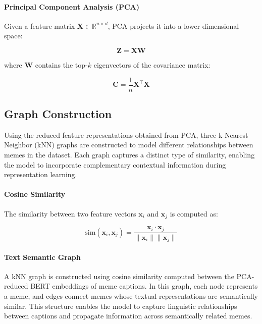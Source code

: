 \documentclass[a4paper]{cas-sc}
\begin{document}
\paragraph{Principal Component Analysis (PCA)}

Given a feature matrix $\mathbf{X} \in \mathbb{R}^{n \times d}$, PCA projects it into a lower-dimensional space:

\begin{equation}
\mathbf{Z} = \mathbf{X}\mathbf{W}
\end{equation}

where $\mathbf{W}$ contains the top-$k$ eigenvectors of the covariance matrix:

\begin{equation}
\mathbf{C} = \frac{1}{n} \mathbf{X}^\top \mathbf{X}
\end{equation}

\subsection{Graph Construction}

Using the reduced feature representations obtained from PCA, three k-Nearest Neighbor (kNN) graphs are constructed to model different relationships between memes in the dataset. Each graph captures a distinct type of similarity, enabling the model to incorporate complementary contextual information during representation learning.

\paragraph{Cosine Similarity}

The similarity between two feature vectors $\mathbf{x}_i$ and $\mathbf{x}_j$ is computed as:

\begin{equation}
\text{sim}(\mathbf{x}_i, \mathbf{x}_j) = 
\frac{\mathbf{x}_i \cdot \mathbf{x}_j}
{\|\mathbf{x}_i\| \|\mathbf{x}_j\|}
\end{equation}

\paragraph{Text Semantic Graph}

A kNN graph is constructed using cosine similarity computed between the PCA-reduced BERT embeddings of meme captions. In this graph, each node represents a meme, and edges connect memes whose textual representations are semantically similar. This structure enables the model to capture linguistic relationships between captions and propagate information across semantically related memes.
\end{document}
